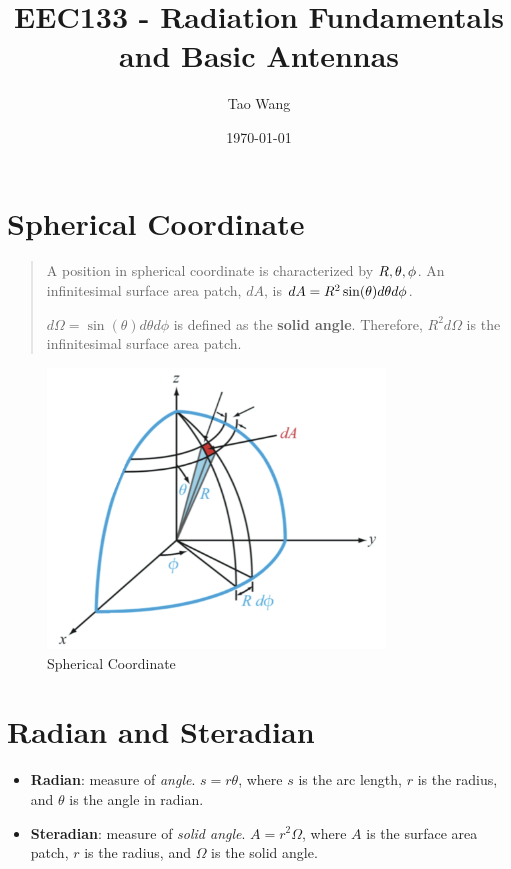 \documentclass{article} %
\begin{document}
\title{EEC133 - Radiation Fundamentals and Basic Antennas}
\author{Tao Wang}
\date{\today}

\maketitle
\tableofcontents

\section{Spherical Coordinate}
\begin{quote}
    A position in spherical coordinate is characterized by $R, \space \theta, \space \phi$.
    An infinitesimal surface area patch, $dA$, is $dA = R^2 \sin(\theta) \space d\theta d\phi$.
    \smallskip

    $d\Omega = \sin(\theta) d\theta d\phi$ is defined as the \textbf{solid angle}.
    Therefore, $R^2 d\Omega$ is the infinitesimal surface area patch.
\end{quote}
\begin{figure}[H]
    \centering
    \includegraphics[width=0.8\textwidth]{./image/figure1.png}
    \caption{Spherical Coordinate}
\end{figure}

\section{Radian and Steradian}
\begin{itemize}
    \item \textbf{Radian}: measure of \textit{angle}. $s = r \theta$, where $s$ is the arc length, $r$ is the radius, and $\theta$ is the angle in radian.
    \item \textbf{Steradian}: measure of \textit{solid angle}. $A = r^2 \Omega$, where $A$ is the surface area patch, $r$ is the radius, and $\Omega$ is the solid angle.
\end{itemize}
\end{document}
